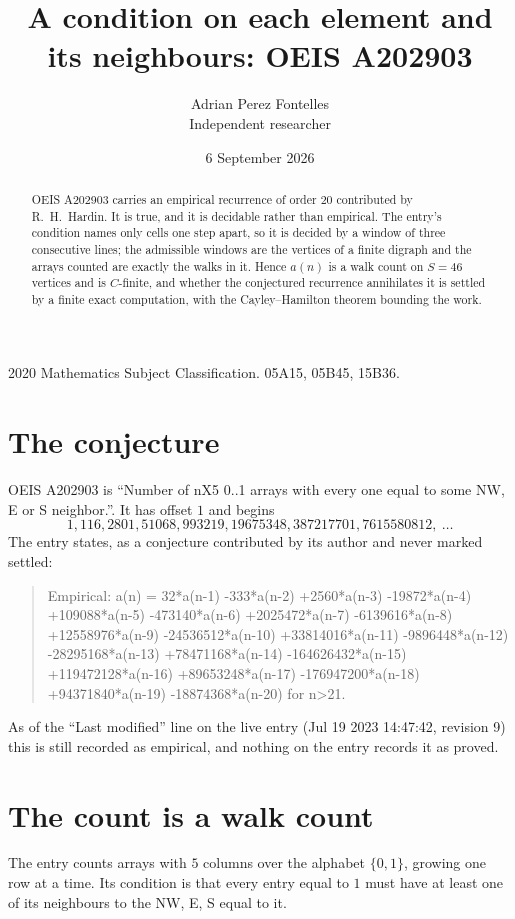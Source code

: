 \documentclass[11pt,a4paper]{article}
\title{A condition on each element and its neighbours: OEIS A202903}
\author{Adrian Perez Fontelles\\ \small Independent researcher}
\date{6 September 2026}
\theoremstyle{plain}
\theoremstyle{definition}
\begin{document}
\maketitle

\begin{abstract}
OEIS A202903 carries an empirical recurrence of order $20$ contributed by R.~H.~Hardin. It is
true, and it is decidable rather than empirical. The entry's condition names only cells one step apart, so it is decided by a window of
three consecutive lines; the
admissible windows are the vertices of a finite digraph and the arrays counted are exactly the
walks in it. Hence $a(n)$ is a walk count on $S=46$ vertices and is $C$-finite, and whether the
conjectured recurrence annihilates it is settled by a finite exact computation, with the
Cayley--Hamilton theorem bounding the work.
\end{abstract}

\noindent\small 2020 Mathematics Subject Classification. 05A15, 05B45, 15B36.\normalsize

\section{The conjecture}

OEIS A202903 is ``Number of nX5 0..1 arrays with every one equal to some NW, E or S neighbor.''. It has offset $1$ and begins
\[
1, 116, 2801, 51068, 993219, 19675348, 387217701, 7615580812,\ \dots
\]
The entry states, as a conjecture contributed by its author and never marked settled:
\begin{quote}
Empirical: a(n) = 32*a(n-1) -333*a(n-2) +2560*a(n-3) -19872*a(n-4) +109088*a(n-5) -473140*a(n-6) +2025472*a(n-7) -6139616*a(n-8) +12558976*a(n-9) -24536512*a(n-10) +33814016*a(n-11) -9896448*a(n-12) -28295168*a(n-13) +78471168*a(n-14) -164626432*a(n-15) +119472128*a(n-16) +89653248*a(n-17) -176947200*a(n-18) +94371840*a(n-19) -18874368*a(n-20) for n>21.
\end{quote}
As of the ``Last modified'' line on the live entry (Jul 19 2023 14:47:42, revision 9) this is still
recorded as empirical, and nothing on the entry records it as proved.

\section{The count is a walk count}

The entry counts arrays with $5$ columns over the alphabet $\{0,1\}$, growing one row at a time. Its condition is that every entry equal to $1$ must have at least one of its neighbours to the NW, E, S equal to it.
\end{document}
